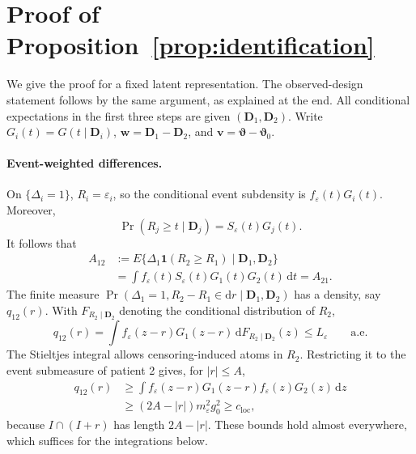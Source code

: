 \section{Proof of Proposition~\ref{prop:identification}}
\label{app:identification}
We give the proof for a fixed latent representation. The observed-design statement follows by the same argument, as explained at the end. All conditional expectations in the first three steps are given $(\bm{D}_1,\bm{D}_2)$. Write $G_i(t)=G(t\mid \bm{D}_i)$, $\bm{w}=\bm{D}_1-\bm{D}_2$, and $\bm{v}=\bm{\vartheta}-\bm{\vartheta}_0$.

\paragraph{Event-weighted differences.}
On $\{\Delta_i=1\}$, $R_i=\varepsilon_i$, so the conditional event subdensity is $f_\varepsilon(t)G_i(t)$. Moreover,
\[
 \Pr(R_j\ge t\mid \bm{D}_j)=S_\varepsilon(t)G_j(t).
\]
It follows that
\begin{equation}
\begin{aligned}
A_{12}&:=E\{\Delta_1\mathbf1(R_2\ge R_1)\mid\bm D_1,\bm D_2\}\\
&=\int f_\varepsilon(t)S_\varepsilon(t)G_1(t)G_2(t)\,\mathrm{d}t=A_{21}.
\end{aligned}
\label{eq:app-centering}
\end{equation}
The finite measure $\Pr(\Delta_1=1,R_2-R_1\in\mathrm{d}r\mid \bm{D}_1,\bm{D}_2)$ has a density, say $q_{12}(r)$. With $F_{R_2\mid \bm{D}_2}$ denoting the conditional distribution of $R_2$,
\begin{equation}
 q_{12}(r)=\int f_\varepsilon(z-r)G_1(z-r)\,\mathrm{d}F_{R_2\mid \bm{D}_2}(z)
 \le L_\varepsilon\qquad\text{a.e.}
 \label{eq:app-density}
\end{equation}
The Stieltjes integral allows censoring-induced atoms in $R_2$. Restricting it to the event submeasure of patient 2 gives, for $|r|\le A$,
\begin{equation}
 \begin{aligned}
 q_{12}(r)
 &\ge \int f_\varepsilon(z-r)G_1(z-r)
              f_\varepsilon(z)G_2(z)\,\mathrm{d}z\\
 &\ge (2A-|r|)m_\varepsilon^2g_0^2
 \ge c_{\mathrm{loc}},
 \end{aligned}
 \label{eq:app-density-lower}
\end{equation}
because $I\cap(I+r)$ has length $2A-|r|$. These bounds hold almost everywhere, which suffices for the integrations below.

